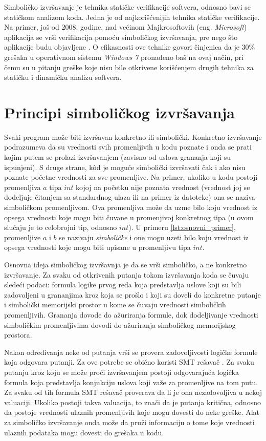 \documentclass[12pt,oneside]{memoir}
\begin{document}
\indent Simboličko izvršavanje je tehnika statičke verifikacije softvera, odnosno bavi se statičkom analizom koda. Jedna je od najkorišćenijih tehnika statičke verifikacije. Na primer, još od 2008. godine, nad većinom Majkrosoftovih (eng. \textit{Microsoft}) aplikacija se vrši verifikacija pomoću simboličkog izvršavanja, pre nego što aplikacije budu objavljene \cite{microsoft}. O efikasnosti ove tehnike govori činjenica da je 30\% grešaka u operativnom sistemu \textit{Windows 7} pronađeno baš na ovaj način, pri čemu su u pitanju greške koje nisu bile otkrivene korišćenjem drugih tehnika za statičku i dinamičku analizu softvera.

\section{Principi simboličkog izvršavanja}

Svaki program može biti izvršavan konkretno ili simbolički. Konkretno izvršavanje podrazumeva da su vrednosti svih promenljivih u kodu poznate i onda se prati kojim putem se prolazi izvršavanjem (zavisno od uslova grananja koji su ispunjeni). S druge strane, k\^od je moguće simbolički izvršavati čak i ako nisu poznate početne vrednosti za sve promenljive. Na primer, ukoliko u kodu postoji promenljiva $a$ tipa $int$ kojoj na početku nije poznata vrednost (vrednost joj se dodeljuje čitanjem sa standardnog ulaza ili na primer iz datoteke) ona se naziva simboličkom promenljivom. Ova promenljiva može da uzme bilo koju vrednost iz opsega vrednosti koje mogu biti čuvane u promenjivoj konkretnog tipa (u ovom slučaju je to celobrojni tip, odnosno $int$). U primeru \ref{lst:osnovni_primer}, promenljive $a$ i $b$ se nazivaju \textit{simboličke} i one mogu uzeti bilo koju vrednost iz opsega vrednosti koje mogu biti upisane u promenljivu tipa $int$.

\indent Osnovna ideja simboličkog izvršavnja je da se vrši simboličko, a ne konkretno izvršavanje. Za svaku od otkrivenih putanja tokom izvršavanja koda se čuvaju sledeći podaci: formula logike prvog reda koja predstavlja uslove koji su bili zadovoljeni u grananjima kroz koja se prošlo i koji su doveli do konkretne putanje i simbolički memorijski prostor u kome se čuvaju vrednosti simboličkih promenljivih. Grananja dovode do ažuriranja formule, dok dodeljivanje vrednosti simboličkim promenljivima dovodi do ažuriranja simboličkog memorijskog prostora. 

\indent Nakon određivanja neke od putanja vrši se provera zadovoljivosti logičke formule koja odgovara putanji. Za ove potrebe se obično koristi SMT rešavač \cite{SMT}. Za svaku putanju kroz koju se može proći izvršavanjem postoji odgovarajuća logička formula koja predstavlja konjukciju uslova koji važe za promenljive na tom putu. Za svaku od tih formula SMT rešavač proverava da li je ona nezadovoljiva u nekoj valuaciji. Ukoliko postoji takva valuacija, to znači da je putanja kritična, odnosno da postoje vrednosti ulaznih promenljivih koje mogu dovesti do neke greške. Alat za simboličko izvršavanje onda može da pruži informaciju o tome koje vrednosti ulaznih podataka mogu dovesti do grešaka u kodu.
\end{document}
